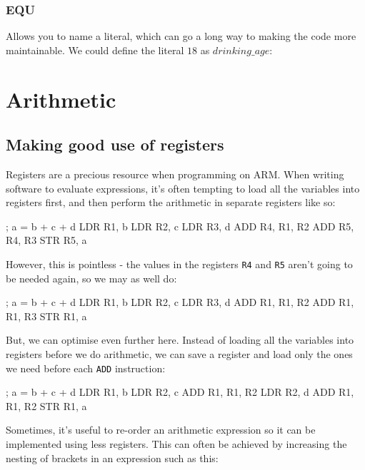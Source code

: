 \documentclass{article}
\begin{document}
\subsubsection{EQU}
Allows you to name a literal, which can go a long way to making the code more maintainable. We could define the literal $18$ as $drinking\_age$:


\section{Arithmetic}

\subsection{Making good use of registers}

Registers are a precious resource when programming on ARM. When writing software to evaluate expressions, it's often tempting to load all the variables into registers first, and then perform the arithmetic in separate registers like so:

\begin{listing}{1}
	; a = b + c + d
	LDR 	R1, b
	LDR 	R2, c
	LDR 	R3, d
	ADD 	R4, R1, R2
	ADD 	R5, R4, R3
	STR 	R5, a
\end{listing}

However, this is pointless - the values in the registers {\tt R4} and {\tt R5} aren't going to be needed again, so we may as well do:

\begin{listing}{1}
; a = b + c + d
LDR 	R1, b
LDR 	R2, c
LDR 	R3, d
ADD 	R1, R1, R2
ADD 	R1, R1, R3
STR 	R1, a
\end{listing}

But, we can optimise even further here. Instead of loading all the variables into registers before we do arithmetic, we can save a register and load only the ones we need before each {\tt ADD} instruction:

\begin{listing}{1}
; a = b + c + d
LDR 	R1, b
LDR 	R2, c
ADD 	R1, R1, R2
LDR 	R2, d
ADD 	R1, R1, R2
STR 	R1, a
\end{listing}

Sometimes, it's useful to re-order an arithmetic expression so it can be implemented using less registers. This can often be achieved by increasing the nesting of brackets in an expression such as this:
\end{document}
